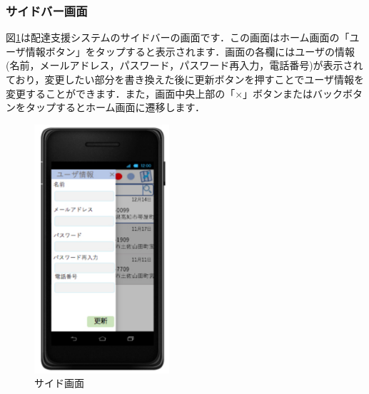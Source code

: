 \documentclass[a4j,titlepage]{jarticle}
\begin{document}
\subsubsection{サイドバー画面}
図\ref{fig:driver_side}は配達支援システムのサイドバーの画面です．この画面はホーム画面の「ユーザ情報ボタン」をタップすると表示されます．画面の各欄にはユーザの情報(名前，メールアドレス，パスワード，パスワード再入力，電話番号)が表示されており，変更したい部分を書き換えた後に更新ボタンを押すことでユーザ情報を変更することができます．また，画面中央上部の「×」ボタンまたはバックボタンをタップするとホーム画面に遷移します．

\begin{figure}[htbp]
 \begin{center}
  \includegraphics[width=50mm]{driver_side.pdf}
	\caption{サイド画面}
	\label{fig:driver_side}
 \end{center}

\end{figure}
\end{document}
